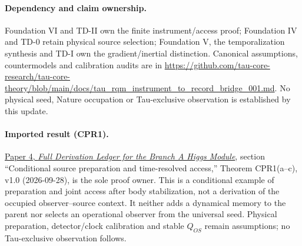 \documentclass[11pt]{article}
\begin{document}
\paragraph{Dependency and claim ownership.}
Foundation VI and TD-II own the finite instrument/access proof; Foundation IV and TD-0 retain physical source selection; Foundation V, the temporalization synthesis and TD-I own the gradient/inertial distinction. Canonical assumptions, countermodels and calibration audits are in \url{https://github.com/tau-core-research/tau-core-theory/blob/main/docs/tau_rqm_instrument_to_record_bridge_001.md}. No physical seed, Nature occupation or Tau-exclusive observation is established by this update.

\paragraph{Imported result (CPR1).}
\href{https://github.com/tau-core-research/tau-core-higgs-module-paper4/blob/main/paper4_full_derivation/full_derivation.pdf#nameddest=cpr1}{Paper 4, \emph{Full Derivation Ledger for the Branch A Higgs Module}}, section ``Conditional source preparation and time-resolved access,'' Theorem CPR1(a--c), v1.0 (2026-09-28), is the sole proof owner.
This is a conditional example of preparation and joint access after body stabilization, not a derivation of the occupied observer--source context. It neither adds a dynamical memory to the parent nor selects an operational observer from the universal seed.
Physical preparation, detector/clock calibration and stable $Q_{OS}$ remain assumptions; no Tau-exclusive observation follows.
\end{document}
